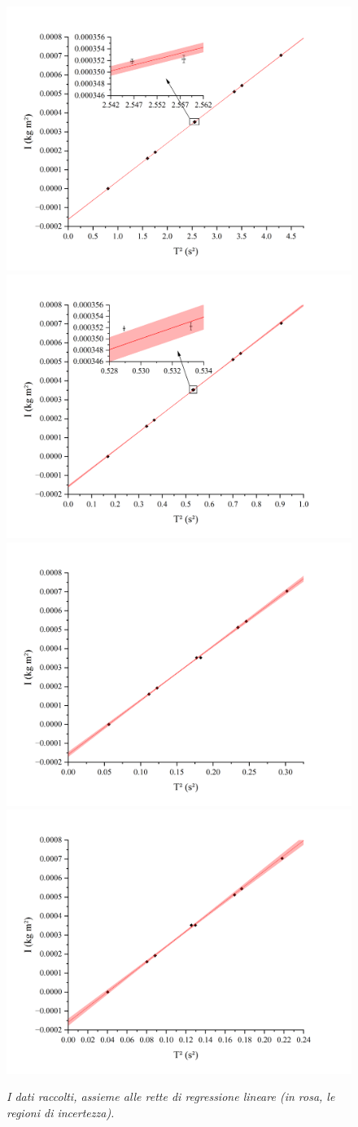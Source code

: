 \documentclass{article}
\begin{document}
\begin{center}
    \begin{figure}[H]
        \includegraphics[trim={1.4cm .5cm 3.1cm 2.1cm},clip,width=.5\textwidth]{img/Reg1.jpg}
        \includegraphics[trim={1.4cm .5cm 3.1cm 2.1cm},clip,width=.5\textwidth]{img/Reg2.jpg}
        \includegraphics[trim={1.4cm .5cm 3.1cm 2.1cm},clip,width=.5\textwidth]{img/Reg3.jpg}
        \includegraphics[trim={1.4cm .5cm 3.1cm 2.1cm},clip,width=.5\textwidth]{img/Reg4.jpg}
        \caption{\emph{
            I dati raccolti, assieme alle rette di regressione lineare
            (in rosa, le regioni di incertezza).
        }}
    \end{figure}
\end{center}
\end{document}
